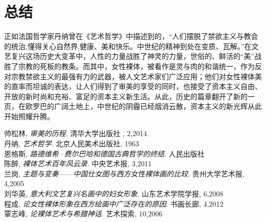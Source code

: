 \documentclass[UTF8,a4paper]{ctexart}
\begin{document}
\section{总结}
正如法国哲学家丹纳曾在《艺术哲学》中描述到的，``人们摆脱了禁欲主义与教会的统治,懂得关心自然界,健康、美和快乐。中世纪的精神到处在变质、瓦解。''在文艺复兴这场历史大变革中，人性的力量战胜了神灵的力量，世俗的、鲜活的``美''战胜了宗教的死板的教条。而其中，女性裸体，被看作是灵与肉的和谐统一，作为反对宗教禁欲主义的最强有力的武器，被人文艺术家们广泛应用；他们对女性裸体美的直率而坦诚的表达，让人们得到了审美的享受的同时，也接受了资本主义自由、开放的新时尚和充裕、富足的资本主义新生活。从此，历史的篇章翻开了新的一页，在欧罗巴的广阔土地上，中世纪的阴霾已经烟消云散，资本主义的新光辉从此开始照耀升腾。






	帅松林,
	 \emph{审美的历程}.
	清华大学出版社 ,
	2,2014.\\


	
丹纳,
	 \emph{艺术哲学}.
北京人民美术出版社,
1963\\

	
	恩格斯,
	\emph{路德维希·费尔巴哈和德国古典哲学的终结}.
	人民出版社\\




	陈醉,
	\emph{裸体艺术百年风云录}.
	中央艺术报,
	3,2011\\


	兰岗,
	\emph{主题与变奏——中国仕女图与西方女性裸体画的比较}.
	贵州大学艺术报,
	4,2005\\



	刘华英,
	\emph{意大利文艺复兴名画中的妇女形象}.
	山东艺术学院学报,
	6,2008\\



	程成,
	\emph{论女性裸体形象在西方绘画中广泛存在的原因}.
	书画长廊,
	4,2012\\

	覃志峰,
	\emph{论裸体艺术与希腊神话}.
	艺术探索,
	10,2006
\end{document}
